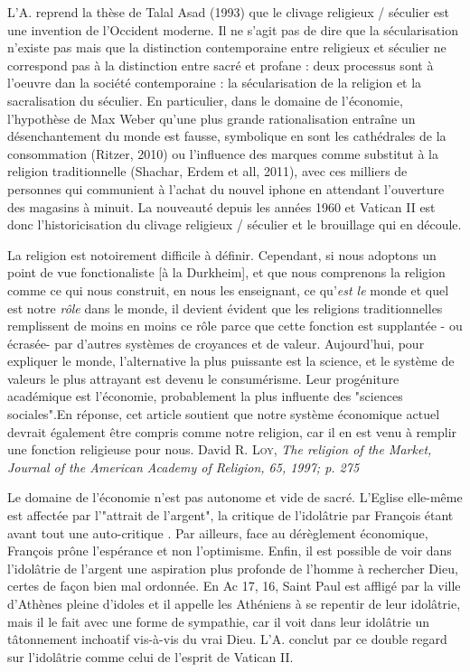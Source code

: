L'A. reprend la thèse de Talal Asad (1993) que le clivage religieux / séculier est une invention de l'Occident moderne. Il ne s'agit pas de dire que la sécularisation n'existe pas mais que la distinction contemporaine entre religieux et séculier ne correspond pas à la distinction entre sacré et profane : deux processus sont à l'oeuvre dan la société contemporaine : la sécularisation de la religion et la sacralisation du séculier. \cite[p. 155]{cavanaugh_idolatrie_2022} En particulier, dans le domaine de l'économie, l'hypothèse de Max Weber qu'une plus grande rationalisation entraîne un désenchantement du monde est fausse, symbolique en sont les cathédrales de la consommation (Ritzer, 2010) ou l'influence des marques comme substitut à la religion traditionnelle (Shachar, Erdem et all, 2011), avec ces milliers de personnes qui communient à l'achat du nouvel iphone en attendant l'ouverture des magasins à minuit. La nouveauté depuis les années 1960 et Vatican II est donc l'historicisation du clivage religieux / séculier et le brouillage qui en découle. 
\begin{singlequote}
    La religion est notoirement difficile à définir. Cependant, si nous adoptons un point de vue fonctionaliste [à la Durkheim], et que nous comprenons la religion comme ce qui nous construit, en nous les enseignant, ce qu'\textit{est le } monde et quel est notre \textit{rôle} dans le monde, il devient évident que les religions traditionnelles remplissent de moins en moins ce rôle parce que cette fonction est supplantée - ou écrasée- par d'autres systèmes de croyances et de valeur. Aujourd'hui, pour expliquer le monde, l'alternative la plus puissante est la science, et le système de valeurs le plus attrayant est devenu le consumérisme. Leur progéniture académique est l'économie, probablement la plus influente des "sciences sociales".En réponse, cet article soutient que notre système économique actuel devrait également être compris comme notre religion, car il en est venu à remplir une fonction religieuse pour nous. David R. 
 \textsc{Loy}, \textit{ The religion of the Market, \textit{Journal of the American Academy of Religion}, 65, 1997; p. 275}
\end{singlequote}
Le domaine de l'économie n'est pas autonome et vide de sacré. L'Eglise elle-même est affectée par l'"attrait de l'argent", la critique de l'idolâtrie par François étant avant tout une auto-critique \cite[p.160]{cavanaugh_idolatrie_2022}. Par ailleurs, face au dérèglement économique, François prône l'espérance et non l'optimisme.  Enfin, il est possible de voir dans l'idolâtrie de l'argent une aspiration plus profonde de l'homme à rechercher Dieu, certes de façon bien mal ordonnée. En Ac 17, 16, Saint Paul est affligé par la ville d'Athènes pleine d'idoles et il appelle les Athéniens à se repentir de leur idolâtrie, mais il le fait avec une forme de sympathie, car il voit dans leur idolâtrie un tâtonnement inchoatif vis-à-vis du vrai Dieu. L'A. conclut par ce double regard sur l'idolâtrie comme celui de l'esprit de Vatican II.

